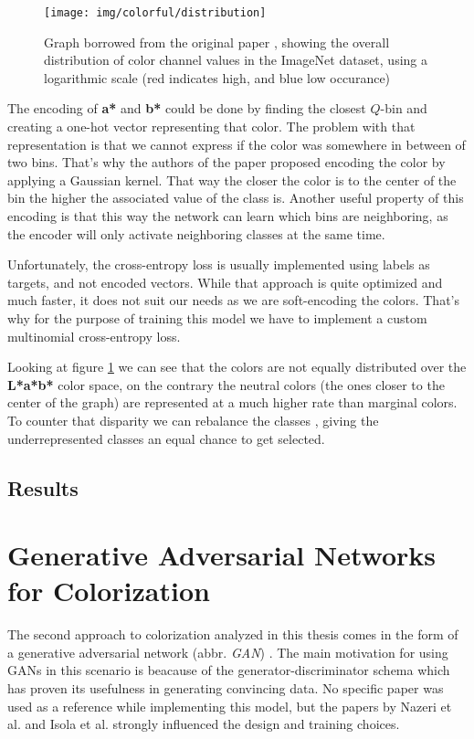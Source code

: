 \begin{figure}[!ht]
	\centering
	\texttt{[image: img/colorful/distribution]}
    \caption{Graph borrowed from the original paper \citep{zhang2016colorful}, 
	showing the overall distribution of color channel values in the ImageNet
	dataset, using a logarithmic scale (red indicates high, and blue low occurance)}
	\label{fig:distribution}
\end{figure}

The encoding of \textbf{a*} and \textbf{b*} could be done by finding the 
closest $Q$-bin and creating a one-hot vector representing that color. The 
problem with that representation is that we cannot express if the color
was somewhere in between of two bins. That's why the authors of the 
paper proposed encoding the color by applying a Gaussian kernel. That way
the closer the color is to the center of the bin the higher the associated
value of the class is. Another useful property of this encoding is that this way
the network can learn which bins are neighboring, as the encoder will only 
activate neighboring classes at the same time.

Unfortunately, the cross-entropy loss is usually implemented using labels as targets,
and not encoded vectors. While that approach is quite optimized and much faster, 
it does not suit our needs as we are soft-encoding the colors. That's why for 
the purpose of training this model we have to implement a custom multinomial 
cross-entropy loss.

Looking at figure \ref{fig:distribution} we can see that the colors are not 
equally distributed over the \textbf{L*a*b*} color space, on the contrary
the neutral colors (the ones closer to the center of the graph) are represented
at a much higher rate than marginal colors. To counter that disparity we can
rebalance the classes \citep{tantithamthavorn2020rebalancing}, giving the 
underrepresented classes an equal chance to get selected.

\subsection{Results}

\clearpage
\section{Generative Adversarial Networks for Colorization}
\label{sec:gan}

The second approach to colorization analyzed in this thesis comes in the form
of a generative adversarial network (abbr. \textit{GAN}) \citep{goodfellow2014generative}.
The main motivation for using GANs in this scenario is beacause of the 
generator-discriminator schema which has proven its usefulness in generating 
convincing data. No specific paper was used as a reference while implementing 
this model, but the papers by Nazeri et al. \citep{nazeri2018gan} and Isola 
et al. \citep{isola2017pix2pix} strongly influenced the design and training choices.

